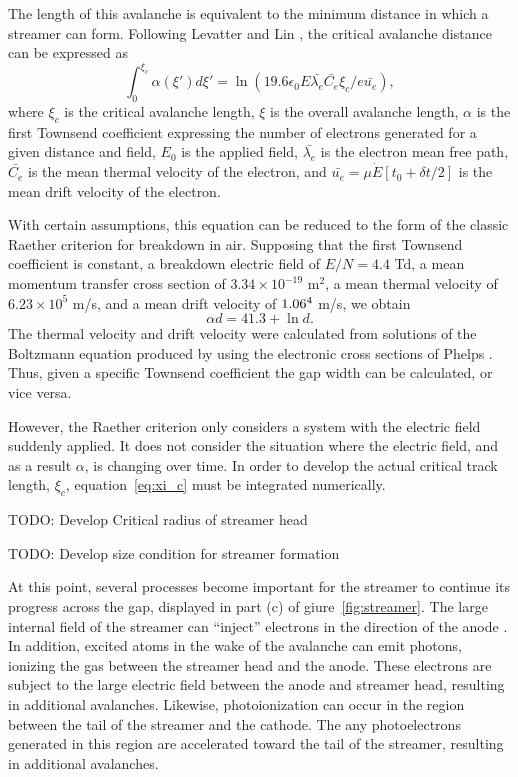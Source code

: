 The length of this avalanche is equivalent to the minimum distance in
which a streamer can form. Following Levatter and Lin
\cite{Levatter1980}, the critical avalanche distance can be expressed as
\begin{equation}
  \int_0^{\xi_c}\alpha(\xi')d\xi' = \ln\left(19.6 \epsilon_0 E \bar{\lambda_e}
                                           \bar{C_e}\xi_c/e\bar{u_e}\right),
  \label{eq:xi_c}
\end{equation}
where $\xi_c$ is the critical avalanche length, $\xi$ is the overall
avalanche length, $\alpha$ is the first Townsend coefficient expressing
the number of electrons generated for a given distance and field, $E_0$ is
the applied field, $\bar{\lambda_e}$ is the electron mean free path,
$\bar{C_e}$ is the mean thermal velocity of the electron, and $\bar{u_e}
= \mu\dot{E}[t_0+\delta t/2]$ is the mean drift velocity of the
electron.

With certain assumptions, this equation can be reduced to the form of
the classic Raether criterion for breakdown in air. Supposing that the
first Townsend coefficient is constant, a breakdown electric field of
$E/N=4.4$ Td, a mean momentum transfer cross section of
$3.34\times10^{-19}$ m$^2$, a mean thermal velocity of $6.23\times10^5$
m/s, and a mean drift velocity of $1.06\time10^4$ m/s, we obtain
\begin{equation}
  \alpha d = 41.3 + \ln{d}.
\end{equation}
The thermal velocity and drift velocity were calculated from solutions
of the Boltzmann equation produced by 
\cite{Hagelaar2005} using the electronic cross sections of Phelps
\cite{Phelps2002}. Thus, given a specific Townsend coefficient the gap
width can be calculated, or vice versa.

However, the Raether criterion only considers a system with the electric
field suddenly applied. It does not consider the situation where the
electric field, and as a result $\alpha$, is changing over time. In
order to develop the actual critical track length, $\xi_c$,
equation~\ref{eq:xi_c} must be integrated numerically. 

TODO: Develop Critical radius of streamer head

TODO: Develop size condition for streamer formation

At this point, several processes become important for the streamer to
continue its progress across the gap, displayed in part (c) of
giure~\ref{fig:streamer}. The large internal field of the streamer can
``inject'' electrons in the direction of the anode \cite{Kunhardt1980}.
In addition, excited atoms in the wake of the avalanche can emit
photons, ionizing the gas between the streamer head and the anode. These
electrons are subject to the large electric field between the anode and
streamer head, resulting in additional avalanches. Likewise,
photoionization can occur in the region between the tail of the streamer
and the cathode. The any photoelectrons generated in this region are
accelerated toward the tail of the streamer, resulting in additional
avalanches.

